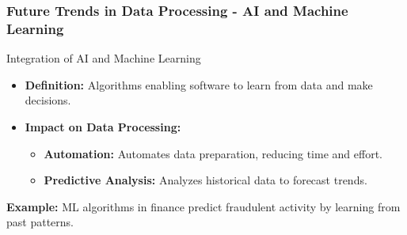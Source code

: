 \documentclass[aspectratio=169]{beamer}
\begin{document}
\begin{frame}[fragile]
    \frametitle{Future Trends in Data Processing - AI and Machine Learning}
    \begin{block}{Integration of AI and Machine Learning}
        \begin{itemize}
            \item \textbf{Definition:} Algorithms enabling software to learn from data and make decisions.
            \item \textbf{Impact on Data Processing:}
                \begin{itemize}
                    \item \textbf{Automation:} Automates data preparation, reducing time and effort.
                    \item \textbf{Predictive Analysis:} Analyzes historical data to forecast trends.
                \end{itemize}
        \end{itemize}
        \textbf{Example:} ML algorithms in finance predict fraudulent activity by learning from past patterns.
    \end{block}
\end{frame}
\end{document}
